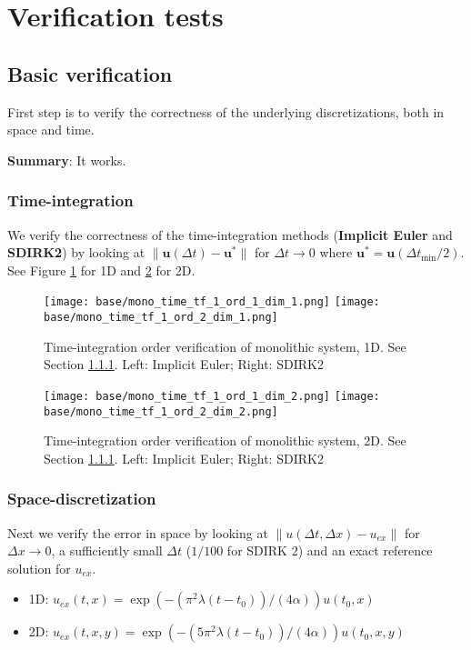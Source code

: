 \documentclass[a4paper,10pt]{article}
\begin{document}
\section{Verification tests}
\subsection{Basic verification}
% 
First step is to verify the correctness of the underlying discretizations, both in space and time. 

\textbf{Summary}: It works.
% 
\subsubsection{Time-integration}\label{SEC MONO TIME INT}
% 
We verify the correctness of the time-integration methods (\textbf{Implicit Euler} and \textbf{SDIRK2}) by looking at $\| \bm{u}(\Delta t) - \bm{u}^*\|$ for $\Delta t\rightarrow 0$ where $\bm{u}^* = \bm{u}(\Delta t_{\min}/2)$. See Figure \ref{FIG MONO TIME 1D} for 1D and \ref{FIG MONO TIME 2D} for 2D.

\begin{figure}[!ht]
\texttt{[image: base/mono\_time\_tf\_1\_ord\_1\_dim\_1.png]}
\texttt{[image: base/mono\_time\_tf\_1\_ord\_2\_dim\_1.png]}
\caption{Time-integration order verification of monolithic system, 1D. See Section \ref{SEC MONO TIME INT}. Left: Implicit Euler; Right: SDIRK2}
\label{FIG MONO TIME 1D}
\end{figure}

\begin{figure}[!ht]
\texttt{[image: base/mono\_time\_tf\_1\_ord\_1\_dim\_2.png]}
\texttt{[image: base/mono\_time\_tf\_1\_ord\_2\_dim\_2.png]}
\caption{Time-integration order verification of monolithic system, 2D. See Section \ref{SEC MONO TIME INT}. Left: Implicit Euler; Right: SDIRK2}
\label{FIG MONO TIME 2D}
\end{figure}
% 
\FloatBarrier
% 
\subsubsection{Space-discretization}\label{SEC SPACE ERROR}
% 
Next we verify the error in space by looking at $\| u(\Delta t, \Delta x) - u_{ex} \|$ for $\Delta x \rightarrow 0$, a sufficiently small $\Delta t$ ($1/100$ for SDIRK 2) and an exact reference solution for $u_{ex}$.
\begin{itemize}
\item 1D: $u_{ex}(t, x) = \exp(-(\pi^2 \lambda (t - t_0))/(4 \alpha)) u(t_0, x)$
\item 2D: $u_{ex}(t, x, y) = \exp(-(5 \pi^2 \lambda (t - t_0))/(4 \alpha)) u(t_0, x, y)$
\end{itemize}
\end{document}
